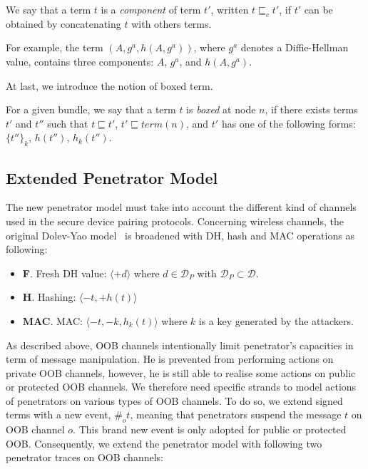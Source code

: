 \begin{Definition}[Component]
We say that a term $t$ is a \emph{component} of term $t'$, written $t \sqsubseteq_c t'$, if $t'$ can be obtained by concatenating $t$ with others terms.
\end{Definition}

For example, the term $(A,g^a,h(A,g^a))$, where $g^a$ denotes a Diffie-Hellman value, contains three components: $A$, $g^a$, and $h(A,g^a)$.

At last, we introduce the notion of boxed term.

\begin{Definition} 
For a given bundle, we say that a term $t$ is \emph{boxed} at node $n$, if there exists terms $t'$ and $t''$ such that $t \sqsubseteq t'$, $t' \sqsubseteq term(n)$, and $t'$ has one of the following forms: ${\{t''\}}_k$, $h(t'')$, $h_k(t'')$.
\end{Definition}

\subsection{Extended Penetrator Model}\label{penetrator_model}

The new penetrator model must take into account the different kind of channels used in the secure device pairing protocols. Concerning wireless channels, the original Dolev-Yao model~\cite{dolev-yao} is broadened with DH, hash and MAC operations as following:
\begin{itemize}
\item \textbf{F}. Fresh DH value: $\langle +d   \rangle$  where $d \in \mathcal{D}_P$ with $\mathcal{D}_P \subset \mathcal{D}$.
\item \textbf{H}. Hashing: $\langle -t,+h(t)   \rangle$  
\item \textbf{MAC}. MAC: $\langle -t,-k, h_k(t)   \rangle$ where $k$ is a key generated by the attackers. 
\end{itemize} 

As described above, OOB channels intentionally limit penetrator's capacities in term of message manipulation. He is prevented from performing actions on private OOB channels, however, he is still able to realise some actions on public or protected OOB channels. We therefore need specific strands to model actions of penetrators on various types of OOB channels. To do so, we extend signed terms with a new event, $\#_ot$, meaning that penetrators suspend the message $t$ on OOB channel $o$. This brand new event is only adopted for public or protected OOB. Consequently, we extend the penetrator model with following two penetrator traces on OOB channels:


